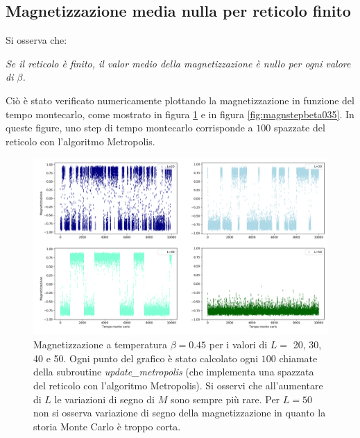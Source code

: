 \documentclass[10pt,a4paper]{article}
\begin{document}
\subsection{Magnetizzazione media nulla per reticolo finito}
Si osserva che:
\begin{center}
	\emph{Se il reticolo è finito, il valor medio della magnetizzazione è nullo per ogni valore di $\beta$.}
\end{center}
Ciò è stato verificato numericamente plottando la magnetizzazione in funzione del tempo montecarlo, come mostrato in figura \ref{fig:magnstepbeta045} e in figura \ref{fig:magnstepbeta035}. In queste figure, uno step di tempo montecarlo corrisponde a $100$ spazzate del reticolo con l'algoritmo Metropolis. %
\begin{figure}[h!]
	\centering
	\includegraphics[width=1\linewidth]{magn_step_beta045rinnovo}
	\caption{Magnetizzazione a temperatura $\beta=0.45$ per i valori di $L=$ 20, 30, 40 e 50. Ogni punto del grafico è stato calcolato ogni $100$ chiamate della subroutine \emph{update\_metropolis} (che implementa una spazzata del reticolo con l'algoritmo Metropolis). Si osservi che all’aumentare di $L$ le variazioni di segno di $M$ sono sempre più rare. Per $L=50$ non si osserva variazione di segno della magnetizzazione in quanto la storia Monte Carlo è troppo corta.}
	\label{fig:magnstepbeta045}
\end{figure}
\end{document}
